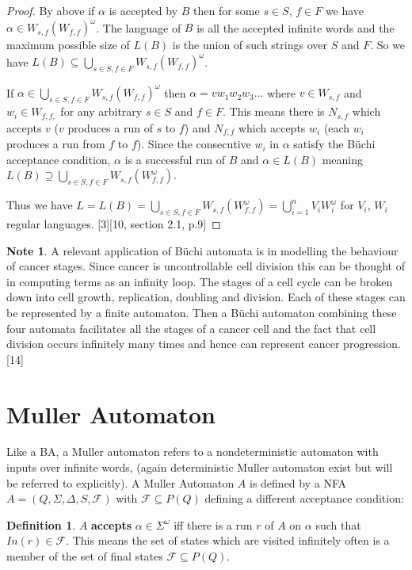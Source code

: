 \documentclass[a4paper,12pt]{report}
\theoremstyle{definition}
\newtheorem{definition}{Definition}[subsection]
\newtheorem{note}{Note}[subsection]
\begin{document}
\begin{proof}
By above if $\alpha$ is accepted by $B$ then for some $s\in S$, $f\in F$ we have $\alpha\in W_{s,f}(W_{f,f})^\omega$. The language of $B$ is all the accepted infinite words and the maximum possible size of $L(B)$ is the union of such strings over $S$ and $F$. So we have $L(B) \subseteq  \bigcup_{s\in S, f\in F} W_{s,f}(W_{f,f})^\omega$.

If $\alpha\in\bigcup_{s\in S, f\in F} W_{s,f}(W_{f,f})^\omega$ then $\alpha=vw_1w_2w_3...$ where $v\in W_{s,f}$ and $w_i\in W_{f,f,}$ for any arbitrary $s\in S $ and $f\in F$. This means there is $N_{s,f}$ which accepts $v$ ($v$ produces a run of $s$ to $f$) and $N_{f,f}$ which accepts $w_i$ (each $w_i$ produces a run from $f$ to $f$). Since the consecutive $w_i$ in $\alpha$ satisfy the Büchi acceptance condition, $\alpha$ is a successful run of $B$ and $\alpha\in L(B)$ meaning $L(B) \supseteq  \bigcup_{s\in S, f\in F} W_{s,f}(W_{f,f}^\omega)$.

Thus we have $L=L(B)=\bigcup_{s\in S, f\in F} W_{s,f}(W_{f,f}^\omega)=\bigcup_{i=1}^{n} V_iW_i^\omega$ for $V_i$, $W_i$ regular languages.
[3][10, section 2.1, p.9]
\end{proof}

\begin{note}
A relevant application of Büchi automata is in modelling the behaviour of cancer stages. Since cancer is uncontrollable cell division this can be thought of in computing terms as an infinity loop. The stages of a cell cycle can be broken down into cell growth, replication, doubling and division. Each of these stages can be represented by a finite automaton. Then a Büchi automaton combining these four automata facilitates all the stages of a cancer cell and the fact that cell division occurs infinitely many times and hence can represent cancer progression. [14]
\end{note}


\section{Muller Automaton}
Like a BA, a Muller automaton refers to a nondeterministic automaton with inputs over infinite words, (again deterministic Muller automaton exist but will be referred to explicitly). A Muller Automaton $A$ is defined by a NFA $A=(Q,\Sigma, \Delta,S,\mathcal{F})$ with $\mathcal{F}\subseteq P(Q)$ defining a different acceptance condition:

\begin{definition}
$A$ \textbf{accepts} $\alpha\in\Sigma^\omega$ iff there is a run $r$ of $A$ on $\alpha$ such that $In(r)\in \mathcal{F}$. This means the set of states which are visited infinitely often is a member of the set of final states $\mathcal{F}\subseteq P(Q)$.
\end{definition}
\end{document}
